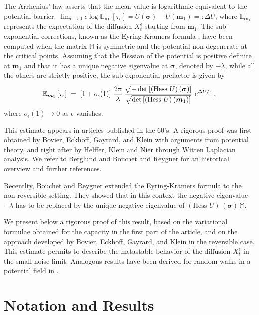 \documentclass[reqno]{amsart}
\newcounter{as}[section]
\newcommand{\bb}[1]{{\mathbb #1}}
\newcommand{\bs}[1]{{\boldsymbol #1}}
\newcommand{\<}{\langle}
\renewcommand{\>}{\rangle}
\begin{document}
The Arrhenius' law \cite{a89} asserts that the mean value is
logarithmic equivalent to the potential barrier: $\lim_{\epsilon\to 0}
\epsilon \log \bb E_{\bs m_1} [\tau_\epsilon] = U(\bs \sigma) - U(\bs
m_1) =:\Delta U$, where $\bb E_{\bs m_1}$ represents the expectation
of the diffusion $X^\epsilon_t$ starting from $\bs m_1$. The
sub-exponential corrections, known as the Eyring-Kramers formula
\cite{e35, k40}, have been computed when the matrix $\bb M$ is
symmetric and the potential non-degenerate at the critical
points. Assuming that the Hessian of the potential is positive
definite at $\bs m_1$ and that it has a unique negative eigenvalue at
$\bs \sigma$, denoted by $- \lambda$, while all the others are
strictly positive, the sub-exponential prefactor is given by
\begin{equation*}
\bb{E}_{\bs{m}_{1}}\left[\tau_{\epsilon}\right]\;=\;
\left[1+o_{\epsilon}(1)\right]\, \frac{2\pi}{\lambda}
\,\frac{\sqrt{-\det\left[(\text{Hess }U) \, (\bs{\sigma})\right]}}
{\sqrt{\det\left[(\text{\rm Hess }U)\, (\bs{m}_{1})\right]}}\,\,
e^{\Delta U/\epsilon}\;,
\end{equation*}
where $o_{\epsilon}(1)\to 0$ as $\epsilon$ vanishes.

This estimate appears in articles published in the 60's.  A rigorous
proof was first obtained by Bovier, Eckhoff, Gayrard, and Klein
\cite{BEGK1} with arguments from potential theory, and right after by
Helffer, Klein and Nier \cite{hkn} through Witten Laplacian
analysis. We refer to Berglund \cite{b13} and Bouchet and Reygner
\cite{BR} for an historical overview and further references.

Recentlty, Bouchet and Reygner \cite{BR} extended the Eyring-Kramers
formula to the non-reversible setting. They showed that in this context
the negative eigenvalue $- \lambda$ has to be replaced by the unique
negative eigenvalue of $(\text{Hess }U) \, (\bs{\sigma}) \, \bb M$.

We present below a rigorous proof of this result, based on the
variational formulae obtained for the capacity in the first part of
the article, and on the approach developed by Bovier, Eckhoff,
Gayrard, and Klein \cite{BEGK1} in the reversible case. This estimate
permits to describe the metastable behavior of the diffusion
$X^\epsilon_t$ in the small noise limit.  Analogous results have been
derived for random walks in a potential field in \cite{LS1, LS2}.


\section{Notation and Results}
\label{sec0}
\end{document}
